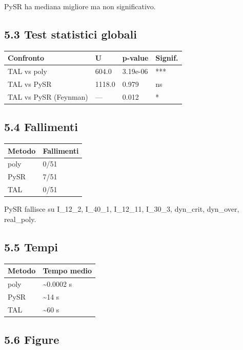 \documentclass[
]{article}
\begin{document}
PySR ha mediana migliore ma non significativo.

\subsection{5.3 Test statistici globali}\label{test-statistici-globali}

\begin{longtable}[]{@{}llll@{}}
\toprule\noalign{}
Confronto & U & p-value & Signif. \\
\midrule\noalign{}
\endhead
\bottomrule\noalign{}
\endlastfoot
TAL vs poly & 604.0 & 3.19e-06 & *** \\
TAL vs PySR & 1118.0 & 0.979 & ns \\
TAL vs PySR (Feynman) & --- & 0.012 & * \\
\end{longtable}

\subsection{5.4 Fallimenti}\label{fallimenti}

\begin{longtable}[]{@{}ll@{}}
\toprule\noalign{}
Metodo & Fallimenti \\
\midrule\noalign{}
\endhead
\bottomrule\noalign{}
\endlastfoot
poly & 0/51 \\
PySR & 7/51 \\
TAL & 0/51 \\
\end{longtable}

PySR fallisce su I\_12\_2, I\_40\_1, I\_12\_11, I\_30\_3, dyn\_crit,
dyn\_over, real\_poly.

\subsection{5.5 Tempi}\label{tempi}

\begin{longtable}[]{@{}ll@{}}
\toprule\noalign{}
Metodo & Tempo medio \\
\midrule\noalign{}
\endhead
\bottomrule\noalign{}
\endlastfoot
poly & \textasciitilde0.0002 s \\
PySR & \textasciitilde14 s \\
TAL & \textasciitilde60 s \\
\end{longtable}

\subsection{5.6 Figure}\label{figure}
\end{document}
